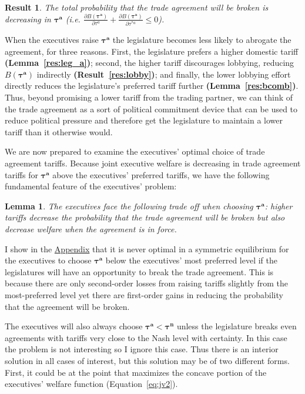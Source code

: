 \documentclass[10pt]{article}
\newtheorem{lemma}{Lemma}
\newtheorem{result}{Result}
\newcommand{\bta}{\bm{\tau^a}}
\newcommand{\btn}{\bm{\tau^n}}
\begin{document}
\begin{result}
	The total probability that the trade agreement will be broken is decreasing in $\bta$ (i.e. $\frac{\partial B(\bta)}{\partial  \tau^a} + \frac{\partial B(\bta)}{\partial  \tau^{*a}} \leq 0$).
	\label{res:bcomB}
\end{result}

\noindent When the executives raise $\bta$ the legislature becomes less likely to abrogate the agreement, for three reasons. First, the legislature prefers a higher domestic tariff \textbf{(Lemma~\ref{res:leg_a})}; second, the higher tariff discourages lobbying, reducing $B(\bta)$ indirectly \textbf{(Result~\ref{res:lobby})}; and finally, the lower lobbying effort directly reduces the legislature's preferred tariff further \textbf{(Lemma~\ref{res:bcomb})}. Thus, beyond promising a lower tariff from the trading partner, we can think of the trade agreement as a sort of political commitment device that can be used to reduce political pressure and therefore get the legislature to maintain a lower tariff than it otherwise would.

We are now prepared to examine the executives' optimal choice of trade agreement tariffs. Because joint executive welfare is decreasing in trade agreement tariffs for $\bta$ above the executives' preferred tariffs, we have the following fundamental feature of the executives' problem:
\begin{lemma}
  The executives face the following trade off when choosing $\bta$: higher tariffs decrease the probability that the trade agreement will be broken but also decrease welfare when the agreement is in force.
  \label{res:to}
\end{lemma}
I show in the \hyperlink{int_soln}{Appendix} that it is never optimal in a symmetric equilibrium for the executives to choose $\bm{\tau^a}$ below the executives' most preferred level if the legislatures will have an opportunity to break the trade agreement. This is because there are only second-order losses from raising tariffs slightly from the most-preferred level yet there are first-order gains in reducing the probability that the agreement will be broken.

The executives will also always choose $\bta < \btn$ unless the legislature breaks even agreements with tariffs very close to the Nash level with certainty. In this case the problem is not interesting so I ignore this case. Thus there is an interior solution in all cases of interest, but this solution may be of two different forms. First, it could be at the point that maximizes the concave portion of the executives' welfare function (Equation~\ref{eq:jv2}).
\end{document}
